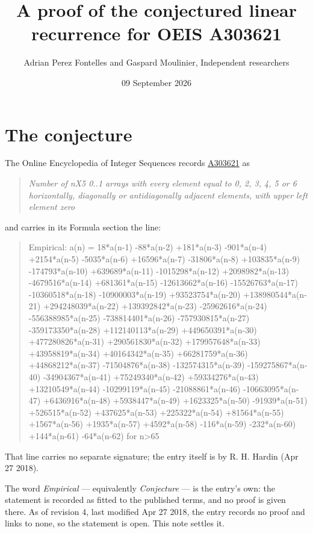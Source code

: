 \documentclass[11pt]{article}
\title{A proof of the conjectured linear recurrence for OEIS A303621}
\author{Adrian Perez Fontelles and Gaspard Moulinier, Independent researchers}
\date{09 September 2026}
\theoremstyle{definition}
\begin{document}
\maketitle
\section{The conjecture}

The Online Encyclopedia of Integer Sequences records \href{https://oeis.org/A303621}{A303621} as

\begin{quote}\itshape Number of nX5 0..1 arrays with every element equal to 0, 2, 3, 4, 5 or 6 horizontally, diagonally or antidiagonally adjacent elements, with upper left element zero\end{quote}

and carries in its Formula section the line:

\begin{quote}\ttfamily Empirical: a(n) = 18*a(n-1) -88*a(n-2) +181*a(n-3) -901*a(n-4) +2154*a(n-5) -5035*a(n-6) +16596*a(n-7) -31806*a(n-8) +103835*a(n-9) -174793*a(n-10) +639689*a(n-11) -1015298*a(n-12) +2098982*a(n-13) -4679516*a(n-14) +681361*a(n-15) -12613662*a(n-16) -15526763*a(n-17) -10360518*a(n-18) -10900003*a(n-19) +93523754*a(n-20) +138980544*a(n-21) +294248039*a(n-22) +139392842*a(n-23) -25962616*a(n-24) -556388985*a(n-25) -738814401*a(n-26) -757930815*a(n-27) -359173350*a(n-28) +112140113*a(n-29) +449650391*a(n-30) +477280826*a(n-31) +290561830*a(n-32) +179957648*a(n-33) +43958819*a(n-34) +40164342*a(n-35) +66281759*a(n-36) +44868212*a(n-37) -71504876*a(n-38) -132574315*a(n-39) -159275867*a(n-40) -34904367*a(n-41) +75249340*a(n-42) +59334276*a(n-43) +13210549*a(n-44) -10299119*a(n-45) -21088861*a(n-46) -10663095*a(n-47) +6436916*a(n-48) +5938447*a(n-49) +1623325*a(n-50) -91939*a(n-51) +526515*a(n-52) +437625*a(n-53) +225322*a(n-54) +81564*a(n-55) +1567*a(n-56) +1935*a(n-57) +4592*a(n-58) -116*a(n-59) -232*a(n-60) +144*a(n-61) -64*a(n-62) for n>65\end{quote}

That line carries no separate signature; the entry itself is by R. H. Hardin (Apr 27 2018).

The word {\itshape Empirical} --- equivalently {\itshape Conjecture} --- is the entry's own: the statement is recorded as fitted to the published terms, and no proof is given there. As of revision 4, last modified Apr 27 2018, the entry records no proof and links to none, so the statement is open. This note settles it.
\end{document}
